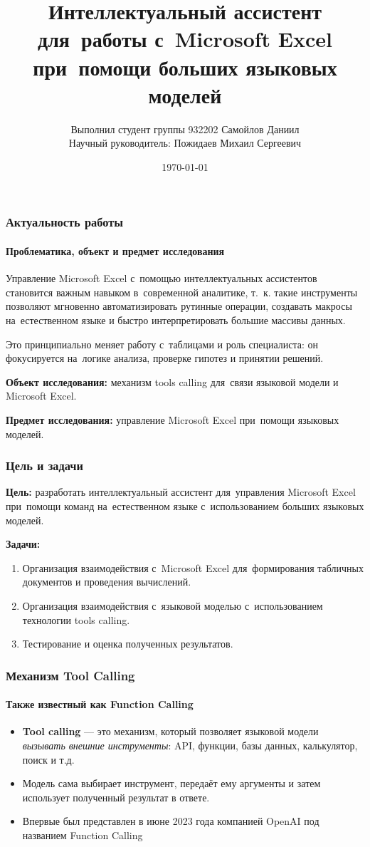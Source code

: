 \documentclass{beamer}
\title{Интеллектуальный ассистент для~работы с~Microsoft Excel при~помощи больших языковых моделей}
\author{%
    Выполнил студент группы 932202 Самойлов Даниил\\
    Научный руководитель: Пожидаев Михаил Сергеевич
}
\date{\today}
\begin{document}
\maketitle

\begin{frame}
\frametitle{Актуальность работы}
\framesubtitle{Проблематика, объект и предмет  исследования}

Управление Microsoft Excel с~помощью интеллектуальных ассистентов становится важным навыком в~современной аналитике,
т.~к. такие инструменты позволяют мгновенно автоматизировать рутинные операции, создавать макросы на~естественном языке и быстро интерпретировать большие массивы данных.


Это принципиально меняет работу с~таблицами и роль специалиста:
он фокусируется на~логике анализа, проверке гипотез и принятии решений.

{\bf Объект исследования:} механизм tools calling для~связи языковой модели и Microsoft Excel.

{\bf Предмет исследования:} управление Microsoft Excel при~помощи языковых моделей.
\end{frame}

\begin{frame}
\frametitle{Цель и задачи}

{\bf Цель:} разработать интеллектуальный ассистент для~управления Microsoft Excel при~помощи команд на~естественном языке с~использованием больших языковых моделей.

{\bf Задачи:}

\begin{enumerate}
\item {Организация взаимодействия с~Microsoft Excel для~формирования табличных документов и проведения вычислений.}
\item {Организация взаимодействия с~языковой моделью с~использованием технологии tools calling.}
\item {Тестирование и оценка полученных результатов.}
\end{enumerate}
\end{frame}

\begin{frame}
\frametitle{Механизм Tool Calling}
\framesubtitle{Также известный как Function Calling}
  \begin{itemize}
    \item \textbf{Tool calling} — это механизм, который позволяет языковой модели \emph{вызывать внешние инструменты}: API, функции, базы данных, калькулятор, поиск и т.д.
    
    \item Модель сама выбирает инструмент, передаёт ему аргументы и затем использует полученный результат в ответе.
    
    \item Впервые был представлен в июне 2023 года компанией OpenAI под названием Function Calling
    \end{itemize}
\end{frame}
\end{document}
